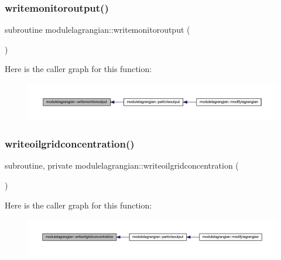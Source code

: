 \subsubsection{\texorpdfstring{writemonitoroutput()}{writemonitoroutput()}}
{\footnotesize\ttfamily subroutine modulelagrangian\+::writemonitoroutput (\begin{DoxyParamCaption}{ }\end{DoxyParamCaption})\hspace{0.3cm}{\ttfamily [private]}}

Here is the caller graph for this function\+:\nopagebreak
\begin{figure}[H]
\begin{center}
\leavevmode
\includegraphics[width=350pt]{namespacemodulelagrangian_a34b406709c4bc499c1d075b26e741c0b_icgraph}
\end{center}
\end{figure}
\mbox{\label{namespacemodulelagrangian_a8b7319e82910c93802b83b6f1391023e}} 
\subsubsection{\texorpdfstring{writeoilgridconcentration()}{writeoilgridconcentration()}}
{\footnotesize\ttfamily subroutine, private modulelagrangian\+::writeoilgridconcentration (\begin{DoxyParamCaption}{ }\end{DoxyParamCaption})\hspace{0.3cm}{\ttfamily [private]}}

Here is the caller graph for this function\+:\nopagebreak
\begin{figure}[H]
\begin{center}
\leavevmode
\includegraphics[width=350pt]{namespacemodulelagrangian_a8b7319e82910c93802b83b6f1391023e_icgraph}
\end{center}
\end{figure}
\mbox{\label{namespacemodulelagrangian_acf6d490f27a032fae7ae0cf84c95989b}} 
